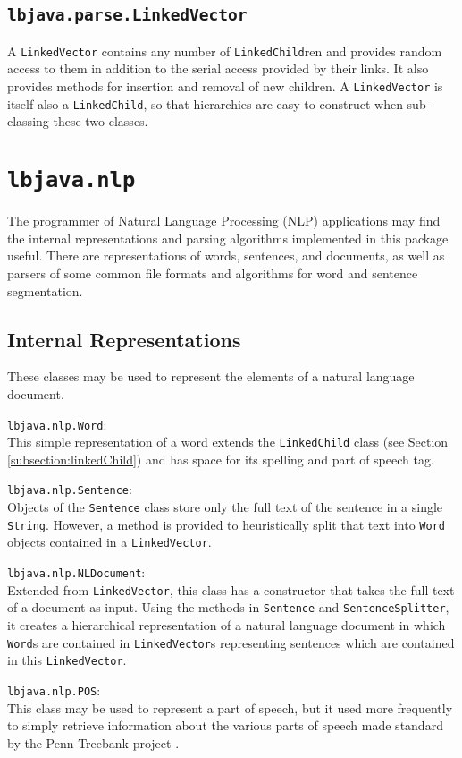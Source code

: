 \subsection{{\tt lbjava.parse.LinkedVector}} \label{subsection:linkedVector}
A {\tt LinkedVector} contains any number of {\tt LinkedChild}ren and provides
random access to them in addition to the serial access provided by their
links.  It also provides methods for insertion and removal of new children.  A
{\tt LinkedVector} is itself also a {\tt LinkedChild}, so that hierarchies are
easy to construct when sub-classing these two classes.

\section{{\tt lbjava.nlp}}

The programmer of Natural Language Processing (NLP) applications may find the
internal representations and parsing algorithms implemented in this package
useful.  There are representations of words, sentences, and documents, as well
as parsers of some common file formats and algorithms for word and sentence
segmentation.

\subsection{Internal Representations} \label{subsection:IR}

These classes may be used to represent the elements of a natural language
document.

\begin{list}{}{}
\item[{\tt lbjava.nlp.Word}:] ~\\
This simple representation of a word extends the {\tt LinkedChild} class (see
Section \ref{subsection:linkedChild}) and has space for its spelling and part
of speech tag.

\item[{\tt lbjava.nlp.Sentence}:] ~\\
Objects of the {\tt Sentence} class store only the full text of the sentence
in a single {\tt String}.  However, a method is provided to heuristically
split that text into {\tt Word} objects contained in a {\tt LinkedVector}.

\item[{\tt lbjava.nlp.NLDocument}:] ~\\
Extended from {\tt LinkedVector}, this class has a constructor that takes the
full text of a document as input.  Using the methods in {\tt Sentence} and
{\tt SentenceSplitter}, it creates a hierarchical representation of a natural
language document in which {\tt Word}s are contained in {\tt LinkedVector}s
representing sentences which are contained in this {\tt LinkedVector}.

\item[{\tt lbjava.nlp.POS}:] ~\\
This class may be used to represent a part of speech, but it used more
frequently to simply retrieve information about the various parts of speech
made standard by the Penn Treebank project \cite{marcus94building}.
\end{list}


